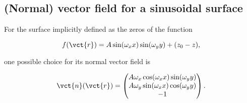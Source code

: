 \subsection{(Normal) vector field for a sinusoidal surface}
\label{sub:_normal_vector_field_for_a_sinusoidal_surface}

For the surface implicitly defined as the zeros of the function

\begin{equation}
    f(\vct{r}) = A\sin(\omega_{x}x)\sin(\omega_{y}y) + (z_{0}-z),
\end{equation}

one possible choice for its normal vector field is

\begin{equation}
    \vct{n}(\vct{r}) = %
    \begin{pmatrix}
        A\omega_{x}\cos(\omega_{x}x)\sin(\omega_{y}y)\\
        A\omega_{y}\sin(\omega_{x}x)\cos(\omega_{y}y)\\
        -1
    \end{pmatrix}.
\end{equation}
